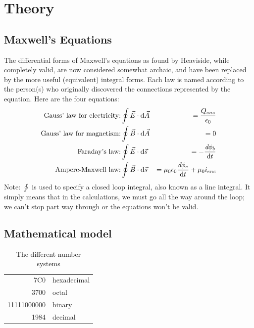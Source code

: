 \documentclass[11pt,openright]{book} %
\begin{document}
\chapter{Theory}
\label{ch:theory}

\section{Maxwell's Equations}
\label{sec:theory}
\indent The differential forms of Maxwell's equations as found by Heaviside, while completely valid, are now considered somewhat archaic, and have been replaced by the more useful (equivalent) integral forms. Each law is named according to the person(s) who originally discovered the connections represented by the equation. Here are the four equations:
\begin{eqnarray}
  \text{Gauss' law for electricity:}& \displaystyle \oint{\vec{E}\cdot\mathrm{d}\vec{A}}&=\frac{Q_{enc}}{\epsilon_0}\\
  \text{Gauss' law for magnetism:}& \displaystyle \oint{\vec{B}\cdot\mathrm{d}\vec{A}}&=0\\
  \text{Faraday's law:}& \displaystyle\oint{\vec{E}\cdot\mathrm{d}\vec{s}}&=-\frac{\emph{d}\phi_b}{\mathrm{d}t}\\
  \text{Ampere-Maxwell law:}& \displaystyle\oint{\vec{B}\cdot\mathrm{d}\vec{s}}&=\mu_0\epsilon_0\frac{\emph{d}\phi_e}{\mathrm{d}t}+\mu_0 i_{enc}
\end{eqnarray}
Note: $\oint$ is used to specify a closed loop integral, also known as a line integral. It simply means that in the calculations, we must go all the way around the loop; we can't stop part way through or the equations won't be valid.

\section{Mathematical model}
\label{sec:back}
\lipsum[8]
\begin{table}[!ht]
  \caption{The different number systems}
  \centering
  \begin{tabular}{|r|l|}
    \hline
    7C0 & hexadecimal \\
    3700 & octal \\ \cline{2-2}
    11111000000 & binary \\
    \hline \hline
    1984 & decimal \\
    \hline
  \end{tabular}
\end{table}
\end{document}
